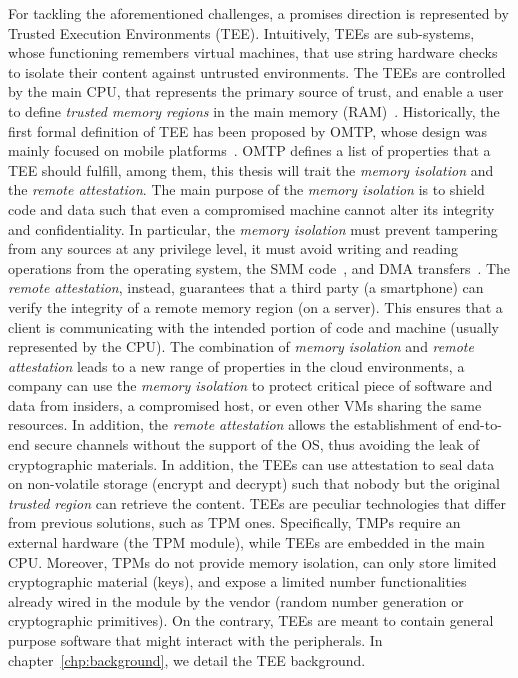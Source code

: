For tackling the aforementioned challenges, a promises direction is 
represented by Trusted Execution Environments (TEE).
Intuitively, TEEs are sub-systems, whose functioning remembers virtual 
machines, that use string hardware checks to isolate their content against 
untrusted environments.
The TEEs are controlled by the main CPU, that represents the primary source of 
trust, and enable a user to define \emph{trusted memory regions} in the main 
memory (RAM)~\citep{Sabt2015TrustedEE}.
Historically, the first formal definition of TEE has been proposed by OMTP, 
whose design was mainly focused on mobile platforms~\citep{omtp}.
OMTP defines a list of properties that a TEE should fulfill, among them, this 
thesis will trait the \emph{memory isolation} and the \emph{remote attestation}.
The main purpose of the \emph{memory isolation} is to shield code and data such 
that even a compromised machine cannot alter its integrity and confidentiality.
In particular, the \emph{memory isolation} must prevent tampering from any 
sources at any privilege level, \eg it must avoid writing and reading 
operations from the operating system, the SMM code~\citep{yao2009system}, and 
DMA transfers~\citep{coke1998implementing}.
The \emph{remote attestation}, instead, guarantees that a third party (\eg a 
smartphone) can verify the integrity of a remote memory region (\eg on a 
server).
This ensures that a client is communicating with the intended portion of code 
and machine (usually represented by the CPU).
The combination of \emph{memory isolation} and \emph{remote attestation} leads 
to a new range of properties in the cloud environments, \ie a company 
can use the \emph{memory isolation} to protect critical piece of 
software and data from insiders, a compromised host, or even other VMs sharing 
the same resources.
In addition, the \emph{remote attestation} allows the establishment of 
end-to-end secure channels without the support of the OS, thus avoiding the 
leak of cryptographic materials.
In addition, the TEEs can use attestation to seal data on non-volatile storage 
(\ie encrypt and decrypt) such that nobody but the original \emph{trusted 
region} can retrieve the content. 
TEEs are peculiar technologies that differ from previous solutions, such as TPM 
ones. Specifically, TMPs require an external hardware (\ie the TPM module), 
while TEEs are embedded in the main CPU.
Moreover, TPMs do not provide memory isolation, can only store limited 
cryptographic material (\eg keys), and expose a limited number functionalities 
already wired in the module by the vendor
(\eg random number generation or cryptographic primitives).
On the contrary, TEEs are meant to contain general purpose software that might 
interact with the peripherals.
In chapter~\ref{chp:background}, we detail the TEE background.

